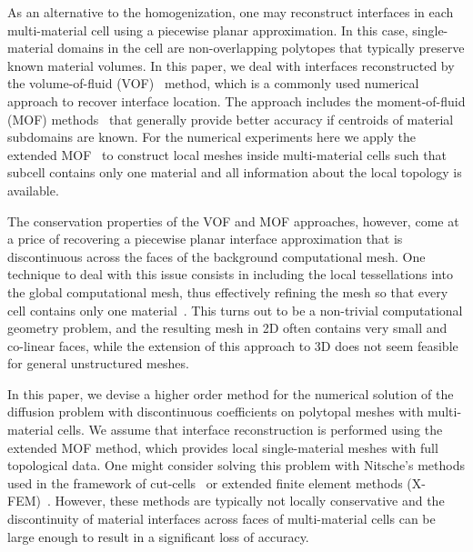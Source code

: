 \documentclass[12pt]{article}
\begin{document}
As an alternative to the homogenization, one may reconstruct interfaces in each  multi-material cell  using a piecewise planar approximation. In this case, single-material domains  in the cell are  non-overlapping polytopes that typically preserve known material volumes.
In this paper, we deal with interfaces reconstructed by the volume-of-fluid (VOF)~\cite{hirt1981volume} method, which is a commonly used numerical  approach to recover interface location. The approach includes the moment-of-fluid (MOF) methods~\cite{ahn2009adaptive} that generally provide better accuracy if centroids of material subdomains are known.
For the numerical experiments here we apply the extended MOF~\cite{kikinzon2018xmof}  to construct local meshes inside multi-material cells such that subcell contains only one material and all information about the local topology is available.

The conservation properties of the  VOF and MOF approaches, however, come at a price of recovering a piecewise planar interface approximation that is  discontinuous across the faces of the background computational mesh.
One technique to deal with this issue consists in including the local tessellations into the global computational mesh, thus effectively refining the mesh so that every cell contains only one material~\cite{garimella2011supermesh}. This turns out to be a non-trivial computational geometry problem, and the resulting mesh in 2D often contains very small and co-linear faces, while the extension of this approach to 3D does not seem feasible for general unstructured meshes.

	In this paper, we devise  a higher order method for the numerical solution of the diffusion problem with discontinuous coefficients on polytopal meshes with multi-material cells. We assume that interface reconstruction is performed using the extended MOF method, which provides local single-material meshes with full topological data. One might consider solving this problem with Nitsche’s methods used in the framework of cut-cells~\cite{burman2015cutfem, hansbo2002unfitted} or extended finite element methods (X-FEM)~\cite{dolbow2008xfem}. However, these methods are typically not locally conservative
and the discontinuity of material interfaces across faces of multi-material cells can be large enough to result in a significant loss of accuracy.
	
\end{document}
